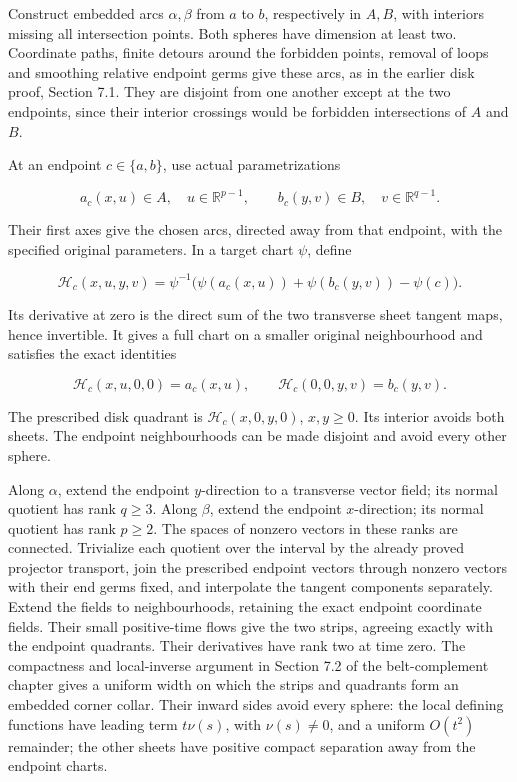 Construct embedded arcs \(\alpha,\beta\) from \(a\) to \(b\), respectively in \(A,B\), with interiors missing all intersection points. Both spheres have dimension at least two. Coordinate paths, finite detours around the forbidden points, removal of loops and smoothing relative endpoint germs give these arcs, as in the earlier disk proof, Section 7.1. They are disjoint from one another except at the two endpoints, since their interior crossings would be forbidden intersections of \(A\) and \(B\).

At an endpoint \(c\in\{a,b\}\), use actual parametrizations

\[
 a_c(x,u)\in A,\quad u\in\mathbb R^{p-1},
 \qquad b_c(y,v)\in B,\quad v\in\mathbb R^{q-1}.
\]

Their first axes give the chosen arcs, directed away from that endpoint, with the specified original parameters. In a target chart \(\psi\), define

\begin{equation}
\mathcal H_c(x,u,y,v)=
 \psi^{-1}\bigl(\psi(a_c(x,u))+\psi(b_c(y,v))-\psi(c)\bigr).
 \label{courseIII:whitney-moves-in-the-receiving-dimensions:eq:1.7}
\end{equation}

Its derivative at zero is the direct sum of the two transverse sheet tangent maps, hence invertible. It gives a full chart on a smaller original neighbourhood and satisfies the exact identities

\begin{equation}
\mathcal H_c(x,u,0,0)=a_c(x,u),\qquad
 \mathcal H_c(0,0,y,v)=b_c(y,v).
 \label{courseIII:whitney-moves-in-the-receiving-dimensions:eq:1.8}
\end{equation}

The prescribed disk quadrant is \(\mathcal H_c(x,0,y,0)\), \(x,y\geq0\). Its interior avoids both sheets. The endpoint neighbourhoods can be made disjoint and avoid every other sphere.

Along \(\alpha\), extend the endpoint \(y\)-direction to a transverse vector field; its normal quotient has rank \(q\geq3\). Along \(\beta\), extend the endpoint \(x\)-direction; its normal quotient has rank \(p\geq2\). The spaces of nonzero vectors in these ranks are connected. Trivialize each quotient over the interval by the already proved projector transport, join the prescribed endpoint vectors through nonzero vectors with their end germs fixed, and interpolate the tangent components separately. Extend the fields to neighbourhoods, retaining the exact endpoint coordinate fields. Their small positive-time flows give the two strips, agreeing exactly with the endpoint quadrants. Their derivatives have rank two at time zero. The compactness and local-inverse argument in Section 7.2 of the belt-complement chapter gives a uniform width on which the strips and quadrants form an embedded corner collar. Their inward sides avoid every sphere: the local defining functions have leading term \(t\nu(s)\), with \(\nu(s)\ne0\), and a uniform \(O(t^2)\) remainder; the other sheets have positive compact separation away from the endpoint charts.

